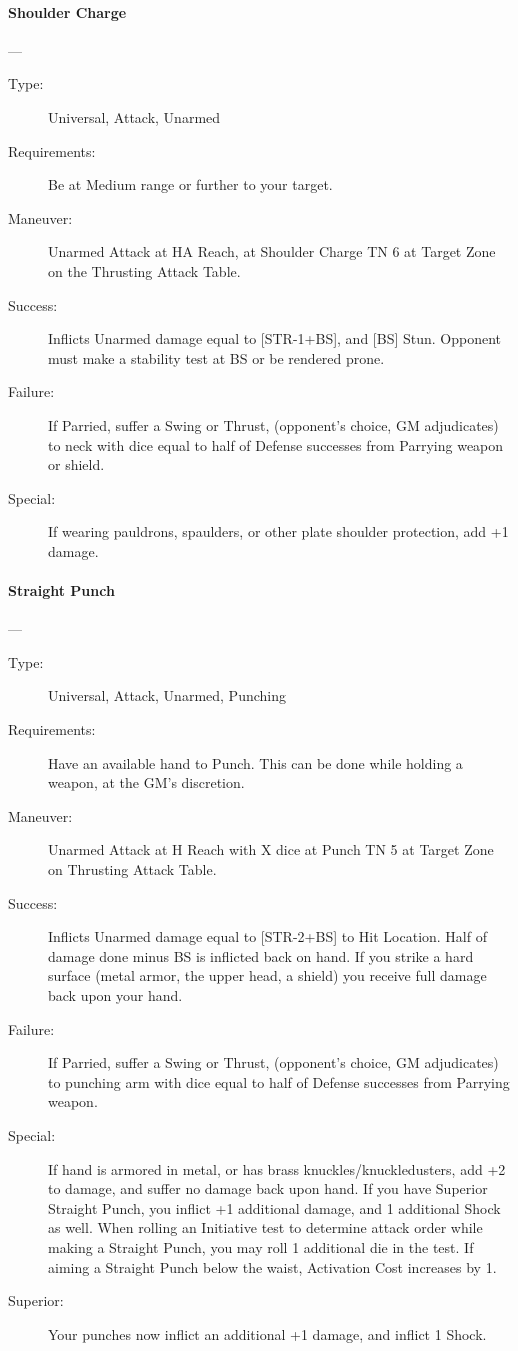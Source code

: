 \documentclass[oneside,11pt,english]{book}
\begin{document}
\paragraph{\large\label{man:Shoulder Charge}Shoulder Charge}---\quad{\large[X]}
\vspace{-10pt}\begin{description} 
\item [Type:] Universal, Attack, Unarmed 
\item [Requirements:] Be at Medium range or further to your target. 
\item [Maneuver:] Unarmed Attack at HA Reach, at Shoulder Charge TN 6 at Target Zone on the Thrusting 
Attack Table. 
\item [Success:] Inflicts Unarmed damage equal to [STR-1+BS], and [BS] Stun. Opponent must make a stability 
test at BS or be rendered prone. 
\item [Failure:] If Parried, suffer a Swing or Thrust, (opponent’s choice, GM adjudicates) to neck with dice 
equal to half of Defense successes from Parrying weapon or shield. 
\item [Special:] If wearing pauldrons, spaulders, or other plate shoulder protection, add +1 damage. 
\end{description}
 

\paragraph{\large\label{man:Straight Punch}Straight Punch}---\quad{\large[X]}
\vspace{-10pt}\begin{description} 
\item [Type:] Universal, Attack, Unarmed, Punching 
\item [Requirements:] Have an available hand to Punch. This can be done while holding a weapon, at the GM's 
discretion. 
\item [Maneuver:] Unarmed Attack at H Reach with X dice at Punch TN 5 at Target Zone on Thrusting Attack 
Table. 
\item [Success:] Inflicts Unarmed damage equal to [STR-2+BS] to Hit Location. Half of damage done minus BS 
is inflicted back on hand. If you strike a hard surface (metal armor, the upper head, a shield) you receive 
full damage back upon your hand. 
\item [Failure:] If Parried, suffer a Swing or Thrust, (opponent’s choice, GM adjudicates) to punching arm with 
dice equal to half of Defense successes from Parrying weapon. 
\item [Special:] If hand is armored in metal, or has brass knuckles/knuckledusters, add +2 to damage, and suffer 
no damage back upon hand. If you have Superior Straight Punch, you inflict +1 additional damage, and 1 
additional Shock as well. 
When rolling an Initiative test to determine attack order while making a Straight Punch, you may roll 1 
additional die in the test. 
If aiming a Straight Punch below the waist, Activation Cost increases by 1. 
\item [Superior:] Your punches now inflict an additional +1 damage, and inflict 1 Shock. 
\end{description}
\end{document}
